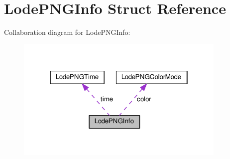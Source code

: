 \hypertarget{struct_lode_p_n_g_info}{}\section{Lode\+P\+N\+G\+Info Struct Reference}
\label{struct_lode_p_n_g_info}


Collaboration diagram for Lode\+P\+N\+G\+Info\+:
\nopagebreak
\begin{figure}[H]
\begin{center}
\leavevmode
\includegraphics[width=286pt]{struct_lode_p_n_g_info__coll__graph}
\end{center}
\end{figure}
